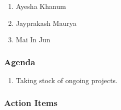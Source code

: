 \documentclass{article}%
\begin{document}
%
\par%
\begin{enumerate}%
\item%
\hypertarget{ID:951258175}{}%
Ayesha Khanum%
\par%
\item%
\hypertarget{ID:236972536}{}%
Jayprakash Maurya%
\par%
\item%
\hypertarget{ID:198298533}{}%
Mai In Jun%
\par%
\end{enumerate}%
\hypertarget{ID:166763818}{}%
\subsubsection{Agenda}%

%
\par%
\begin{enumerate}%
\item%
\hypertarget{ID:1985055068}{}%
Taking stock of ongoing projects.%
\par%
\end{enumerate}%
\hypertarget{ID:160771564}{}%
\subsubsection{Action Items}%
\end{document}
